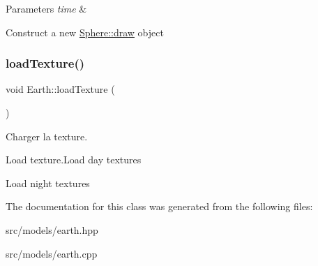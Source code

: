 \begin{DoxyParams}{Parameters}
{\em time} & \\
\hline
\end{DoxyParams}
Construct a new \mbox{\hyperlink{classSphere_a34a34167b7544c95155d3ff30638d045}{Sphere\+::draw}} object \mbox{\label{classEarth_a6ea4717d6f25f585959f8c2a27b310b5}} 
\subsubsection{\texorpdfstring{loadTexture()}{loadTexture()}}
{\footnotesize\ttfamily void Earth\+::load\+Texture (\begin{DoxyParamCaption}{ }\end{DoxyParamCaption})\hspace{0.3cm}{\ttfamily [protected]}}



Charger la texture. 

Load texture.Load day textures

Load night textures 

The documentation for this class was generated from the following files\+:\begin{DoxyCompactItemize}
\item 
src/models/earth.\+hpp\item 
src/models/earth.\+cpp\end{DoxyCompactItemize}
